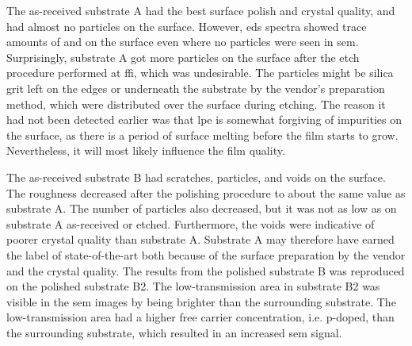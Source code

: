 The as-received substrate A had the best surface polish and crystal quality, and had almost no particles on the surface. However, \ac{eds} spectra showed trace amounts of  and  on the surface even where no particles were seen in \ac{sem}. Surprisingly, substrate A got more particles on the surface after the etch procedure performed at \ac{ffi}, which was undesirable. The particles might be silica grit left on the edges or underneath the substrate by the vendor's preparation method, which were distributed over the surface during etching. The reason it had not been detected earlier was that \ac{lpe} is somewhat forgiving of impurities on the surface, as there is a period of surface melting before the film starts to grow. Nevertheless, it will most likely influence the film quality.

%

The as-received substrate B had scratches, particles, and voids on the surface. The roughness decreased after the polishing procedure to about the same value as substrate A. The number of particles also decreased, but it was not as low as on substrate A as-received or etched. Furthermore, the voids were indicative of poorer crystal quality than substrate A. Substrate A may therefore have earned the label of state-of-the-art both because of the surface preparation by the vendor and the crystal quality. The results from the polished substrate B was reproduced on the polished substrate B2. The low-transmission area in substrate B2 was visible in the \ac{sem} images by being brighter than the surrounding substrate. The low-transmission area had a higher free carrier concentration, i.e. p-doped, than the surrounding substrate, which resulted in an increased \ac{sem} signal.

